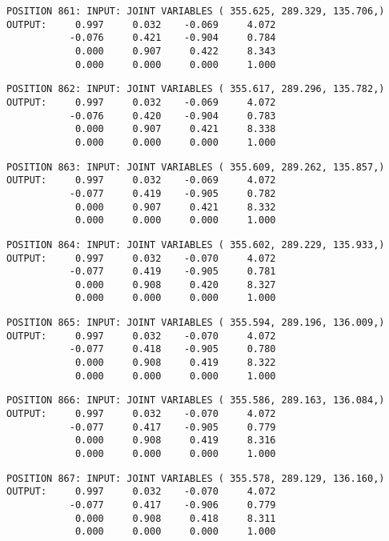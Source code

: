 \begin{verbatim}
POSITION 861: INPUT: JOINT VARIABLES ( 355.625, 289.329, 135.706,)
OUTPUT:     0.997     0.032    -0.069     4.072
           -0.076     0.421    -0.904     0.784
            0.000     0.907     0.422     8.343
            0.000     0.000     0.000     1.000
\end{verbatim} \pagebreak[1]\begin{verbatim}
POSITION 862: INPUT: JOINT VARIABLES ( 355.617, 289.296, 135.782,)
OUTPUT:     0.997     0.032    -0.069     4.072
           -0.076     0.420    -0.904     0.783
            0.000     0.907     0.421     8.338
            0.000     0.000     0.000     1.000
\end{verbatim} \pagebreak[1]\begin{verbatim}
POSITION 863: INPUT: JOINT VARIABLES ( 355.609, 289.262, 135.857,)
OUTPUT:     0.997     0.032    -0.069     4.072
           -0.077     0.419    -0.905     0.782
            0.000     0.907     0.421     8.332
            0.000     0.000     0.000     1.000
\end{verbatim} \pagebreak[1]\begin{verbatim}
POSITION 864: INPUT: JOINT VARIABLES ( 355.602, 289.229, 135.933,)
OUTPUT:     0.997     0.032    -0.070     4.072
           -0.077     0.419    -0.905     0.781
            0.000     0.908     0.420     8.327
            0.000     0.000     0.000     1.000
\end{verbatim} \pagebreak[1]\begin{verbatim}
POSITION 865: INPUT: JOINT VARIABLES ( 355.594, 289.196, 136.009,)
OUTPUT:     0.997     0.032    -0.070     4.072
           -0.077     0.418    -0.905     0.780
            0.000     0.908     0.419     8.322
            0.000     0.000     0.000     1.000
\end{verbatim} \pagebreak[1]\begin{verbatim}
POSITION 866: INPUT: JOINT VARIABLES ( 355.586, 289.163, 136.084,)
OUTPUT:     0.997     0.032    -0.070     4.072
           -0.077     0.417    -0.905     0.779
            0.000     0.908     0.419     8.316
            0.000     0.000     0.000     1.000
\end{verbatim} \pagebreak[1]\begin{verbatim}
POSITION 867: INPUT: JOINT VARIABLES ( 355.578, 289.129, 136.160,)
OUTPUT:     0.997     0.032    -0.070     4.072
           -0.077     0.417    -0.906     0.779
            0.000     0.908     0.418     8.311
            0.000     0.000     0.000     1.000
\end{verbatim} \pagebreak[1]\begin{verbatim}

\end{verbatim}
